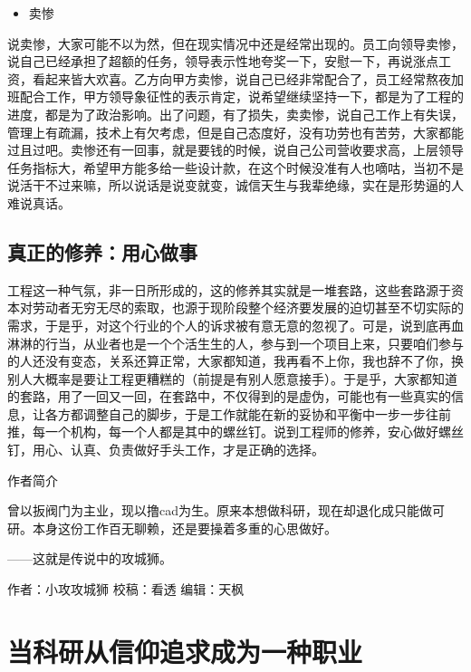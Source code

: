 \documentclass[
]{book}
\providecommand{\tightlist}{%
  \setlength{\itemsep}{0pt}\setlength{\parskip}{0pt}}
\begin{document}
\begin{itemize}
\tightlist
\item
  卖惨
\end{itemize}

说卖惨，大家可能不以为然，但在现实情况中还是经常出现的。员工向领导卖惨，说自己已经承担了超额的任务，领导表示性地夸奖一下，安慰一下，再说涨点工资，看起来皆大欢喜。乙方向甲方卖惨，说自己已经非常配合了，员工经常熬夜加班配合工作，甲方领导象征性的表示肯定，说希望继续坚持一下，都是为了工程的进度，都是为了政治影响。出了问题，有了损失，卖卖惨，说自己工作上有失误，管理上有疏漏，技术上有欠考虑，但是自己态度好，没有功劳也有苦劳，大家都能过且过吧。卖惨还有一回事，就是要钱的时候，说自己公司营收要求高，上层领导任务指标大，希望甲方能多给一些设计款，在这个时候没准有人也嘀咕，当初不是说活干不过来嘛，所以说话是说变就变，诚信天生与我辈绝缘，实在是形势逼的人难说真话。

\hypertarget{ux771fux6b63ux7684ux4feeux517bux7528ux5fc3ux505aux4e8b}{%
\subsection{真正的修养：用心做事}\label{ux771fux6b63ux7684ux4feeux517bux7528ux5fc3ux505aux4e8b}}

工程这一种气氛，非一日所形成的，这的修养其实就是一堆套路，这些套路源于资本对劳动者无穷无尽的索取，也源于现阶段整个经济要发展的迫切甚至不切实际的需求，于是乎，对这个行业的个人的诉求被有意无意的忽视了。可是，说到底再血淋淋的行当，从业者也是一个个活生生的人，参与到一个项目上来，只要咱们参与的人还没有变态，关系还算正常，大家都知道，我再看不上你，我也辞不了你，换别人大概率是要让工程更糟糕的（前提是有别人愿意接手）。于是乎，大家都知道的套路，用了一回又一回，在套路中，不仅得到的是虚伪，可能也有一些真实的信息，让各方都调整自己的脚步，于是工作就能在新的妥协和平衡中一步一步往前推，每一个机构，每一个人都是其中的螺丝钉。说到工程师的修养，安心做好螺丝钉，用心、认真、负责做好手头工作，才是正确的选择。

作者简介

曾以扳阀门为主业，现以撸cad为生。原来本想做科研，现在却退化成只能做可研。本身这份工作百无聊赖，还是要操着多重的心思做好。

------这就是传说中的攻城狮。

作者：小攻攻城狮
校稿：看透
编辑：天枫

\hypertarget{ux5f53ux79d1ux7814ux4eceux4fe1ux4ef0ux8ffdux6c42ux6210ux4e3aux4e00ux79cdux804cux4e1a}{%
\section{当科研从信仰追求成为一种职业}\label{ux5f53ux79d1ux7814ux4eceux4fe1ux4ef0ux8ffdux6c42ux6210ux4e3aux4e00ux79cdux804cux4e1a}}
\end{document}
